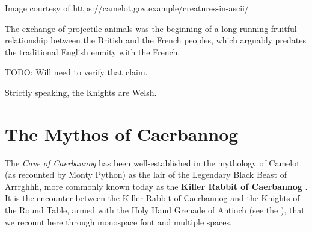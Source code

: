 \documentclass{metanorma}
\begin{document}



\begin{note}
  Image courtesy of
  {https://camelot.gov.example/creatures-in-ascii/}
\end{note}




The exchange of projectile animals was the beginning of a
long-running fruitful relationship between the British and the
French peoples, which
arguably predates the traditional English enmity with the
French.

\begin{reviewernote}
  TODO: Will need to verify that claim.
\end{reviewernote}

\begin{reviewernote}
  Strictly speaking, the Knights are Welsh.
\end{reviewernote}

\begin{comment}
This document, as it turns out, has a profusion of XML comments.

As expected, they are ignored in any rendering of the document.
\end{comment}



\section{The Mythos of Caerbannog}
\label{caerbannog}


The \textit{Cave of Caerbannog} has been well-established in the mythology
of Camelot (as recounted by Monty Python) as the lair of the
Legendary Black Beast of Arrrghhh, more commonly known today as the
\textbf{Killer Rabbit of Caerbannog} .
It is the encounter between the Killer Rabbit of Caerbannog and the
Knights of the Round Table, armed with the Holy Hand Grenade of
Antioch (see the ), that we
recount here through monospace font and multiple spaces.
\end{document}
